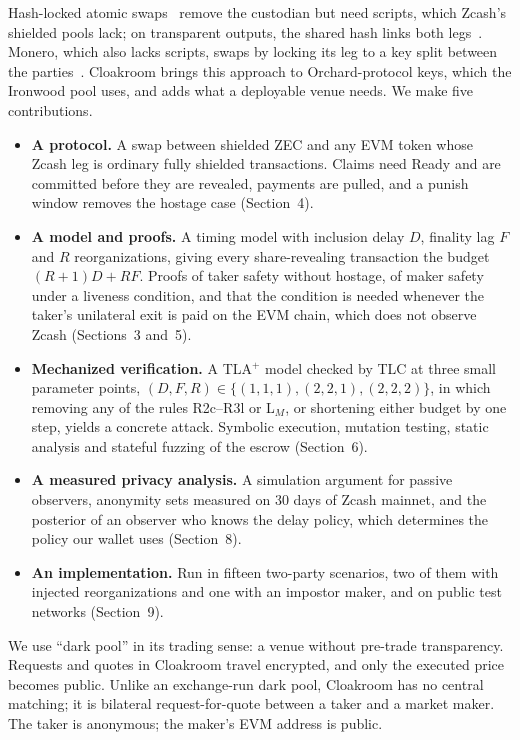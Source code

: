 \documentclass[10pt,letterpaper]{article}
\theoremstyle{plain}
\theoremstyle{definition}
\begin{document}
Hash-locked atomic swaps~\cite{nolan,herlihy} remove the custodian but need scripts, which
Zcash's shielded pools lack; on transparent outputs, the shared hash links both legs~\cite{xcat}.
Monero, which also lacks scripts, swaps by locking its leg to a key split between the
parties~\cite{gugger,athanor}. Cloakroom brings this approach to Orchard-protocol keys, which the
Ironwood pool uses, and adds what a deployable venue needs. We make five contributions.
\begin{itemize}\setlength\itemsep{0.1em}
\item \textbf{A protocol.} A swap between shielded ZEC and any EVM token whose Zcash leg is
ordinary fully shielded transactions. Claims need Ready and are committed before they are
revealed, payments are pulled, and a punish window removes the hostage case
(Section~4).
\item \textbf{A model and proofs.} A timing model with inclusion delay $D$, finality lag $F$
and $R$ reorganizations, giving every share-revealing transaction the budget $(R+1)D + RF$.
Proofs of taker safety without hostage, of maker safety under a liveness condition, and that the
condition is needed whenever the taker's unilateral exit is paid on the EVM chain, which does not
observe Zcash (Sections~3 and~5).
\item \textbf{Mechanized verification.} A TLA$^+$ model checked by TLC at three small parameter points, $(D,F,R) \in \{(1,1,1), (2,2,1), (2,2,2)\}$,
in which removing any of the rules R2c--R3l or L$_M$, or shortening either budget by one step,
yields a concrete attack.
Symbolic execution, mutation testing, static analysis and stateful fuzzing of the escrow
(Section~6).
\item \textbf{A measured privacy analysis.} A simulation argument for passive observers, anonymity
sets measured on 30 days of Zcash mainnet, and the posterior of an observer who knows the delay
policy, which determines the policy our wallet uses (Section~8).
\item \textbf{An implementation.} Run in fifteen two-party scenarios, two of them with injected
reorganizations and one with an impostor maker, and on public test networks (Section~9).
\end{itemize}

We use ``dark pool'' in its trading sense: a venue without pre-trade transparency. Requests and
quotes in Cloakroom travel encrypted, and only the executed price becomes public. Unlike an
exchange-run dark pool, Cloakroom has no central matching; it is bilateral request-for-quote
between a taker and a market maker. The taker is anonymous; the maker's EVM address is public.
\end{document}
